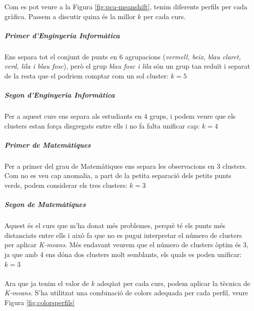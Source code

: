 \documentclass[12pt,a4paper,catalan]{article}
\begin{document}
Com es pot veure a la Figura \ref{fig:pca-meanshift}, tenim diferents perfils per cada gràfica. Passem a discutir quina és la millor $k$ per cada curs.

\subparagraph{Primer d'Enginyeria Informàtica}
Ens separa tot el conjunt de punts en 6 agrupacions (\textit{vermell, beix, blau claret, verd, lila i blau fosc}), però el grup \textit{blau fosc i lila} són un grup tan reduït i separat de la resta que el podriem comptar com un sol cluster: $k=5$

\subparagraph{Segon d'Enginyeria Informàtica}
Per a aquest curs ens separa als estudiants en 4 grups, i podem veure que els clusters estan força disgregats entre ells i no fa falta unificar cap:  $k=4$

\subparagraph{Primer de Matemàtiques} 
Per a primer del grau de Matemàtiques ens separa les observacions en 3 clusters. Com no es veu cap anomalia, a part de la petita separació dels petits punts verds, podem considerar els tres clusters:  $k=3$

\subparagraph{Segon de Matemàtiques}
Aquest és el curs que m'ha donat més problemes, perquè té els punts més distanciats entre ells i això fa que no es pugui interpretar el número de clusters per aplicar \textit{K-means}. Més endavant veurem que el número de clusters òptim és 3, ja que amb 4 ens dóna dos clusters molt semblants, els quals es poden unificar: $k=3$
\\
\\
Ara que ja tenim el valor de $k$ adeqüat per cada curs, podem aplicar la tècnica de \textit{K-means}. S'ha utilitzat una combinació de colors adequada per cada perfil, veure Figura \ref{fig:colorsperfils}
\end{document}
